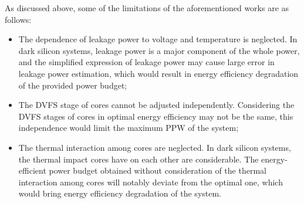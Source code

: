 As discussed above, some of the limitations of the aforementioned works are as follows:
\begin{itemize}  
\item The dependence of leakage power to voltage and temperature is neglected. In dark silicon systems, leakage power is a major component of the whole power, and the simplified expression of leakage power may cause large error in leakage power estimation, which would result in energy efficiency degradation of the provided power budget;
\item The DVFS stage of cores cannot be adjusted independently. Considering the DVFS stages of cores in optimal energy efficiency may not be the same, this independence would limit the maximum PPW of the system;
\item The thermal interaction among cores are neglected. In dark silicon systems, the thermal impact cores have on each other are considerable. The energy-efficient power budget obtained without consideration of the thermal interaction among cores will notably deviate from the optimal one, which would bring energy efficiency degradation of the system.
\end{itemize} 

